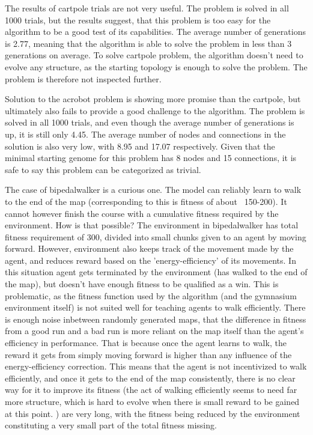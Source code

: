 \documentclass{article}
\begin{document}
    The results of cartpole trials are not very useful. The problem is solved in all 1000 trials, but the results suggest, that 
    this problem is too easy for the algorithm to be a good test of its capabilities. The average number of generations is 2.77, 
    meaning that the algorithm is able to solve the problem in less than 3 generations on average. To solve cartpole problem, the
    algorithm doesn't need to evolve any structure, as the starting topology is enough to solve the problem. The problem is therefore
    not inspected further.

    Solution to the acrobot problem is showing more promise than the cartpole, but ultimately also fails to provide a 
    good challenge to the algorithm. The problem is solved in all 1000 trials, and even though the average number of generations is up, it 
    is still only 4.45. The average number of nodes and connections in the solution is also very low, with 8.95 and 17.07 respectively. 
    Given that the minimal starting genome for this problem has 8 nodes and 15 connections, it is safe to say this problem can be 
    categorized as trivial.

    The case of bipedalwalker is a curious one. The model can reliably learn to walk to the end of the map (corresponding
    to this is fitness of about ~150-200). It cannot however finish the course with a cumulative fitness required by the
    environment. How is that possible? The environment in bipedalwalker has total fitness requirement of 300, divided
    into small chunks given to an agent by moving forward. However, environment also keeps track of the movement made
    by the agent, and reduces reward based on the 'energy-efficiency' of its movements. In this situation agent 
    gets terminated by the environment (has walked to the end of the map), but doesn't have enough fitness to be 
    qualified as a win. 
    This is problematic, as the fitness function used by the algorithm (and the gymnasium environment
    itself) is not suited well for teaching agents to walk efficiently. There is enough noise inbetween
    randomly generated maps, that the difference in fitness from a good run and a bad run is more reliant
    on the map itself than the agent's efficiency in performance.
     That is because once the agent learns to walk, the reward it gets from simply moving forward is higher than any influence
     of the energy-efficiency correction. This means that the agent is not incentivized to walk efficiently, and
     once it gets to the end of the map consistently, there is no clear way for it to improve its fitness (the 
     act of walking efficiently seems to need far more structure, which is hard to evolve when there is small 
     reward to be gained at this point.
    )
    are very long, with the fitness being reduced by the environment constituting a very small part of the total fitness missing.
\end{document}
